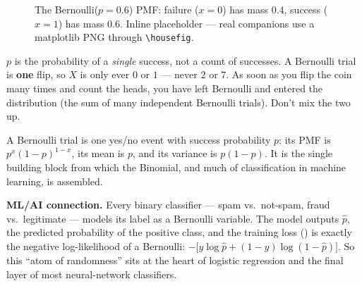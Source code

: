 \begin{figure}[htbp]
  \centering
  \caption{The Bernoulli($p=0.6$) PMF: failure ($x=0$) has mass $0.4$, success
  ($x=1$) has mass $0.6$. Inline placeholder --- real companions use a
  matplotlib PNG through \texttt{\textbackslash housefig}.}
\end{figure}

\begin{watchout}
$p$ is the probability of a \emph{single} success, not a count of successes. A
Bernoulli trial is \textbf{one} flip, so $X$ is only ever $0$ or $1$ --- never $2$
or $7$. As soon as you flip the coin many times and count the heads, you have left
Bernoulli and entered the  distribution (the sum of many
independent Bernoulli trials). Don't mix the two up.
\end{watchout}

\begin{keytake}
A Bernoulli trial is one yes/no event with success probability $p$: its PMF is
$p^{x}(1-p)^{1-x}$, its mean is $p$, and its variance is $p(1-p)$. It is the
single building block from which the Binomial, and much of classification in
machine learning, is assembled.
\end{keytake}

\noindent\textbf{ML/AI connection.}
Every binary classifier --- spam vs.\ not-spam, fraud vs.\ legitimate --- models
its label as a Bernoulli variable. The model outputs $\hat p$, the predicted
probability of the positive class, and the training loss
() is exactly the negative log-likelihood of a
Bernoulli: $-\big[y\log\hat p + (1-y)\log(1-\hat p)\big]$. So this ``atom of
randomness'' sits at the heart of logistic regression and the final layer of most
neural-network classifiers.

